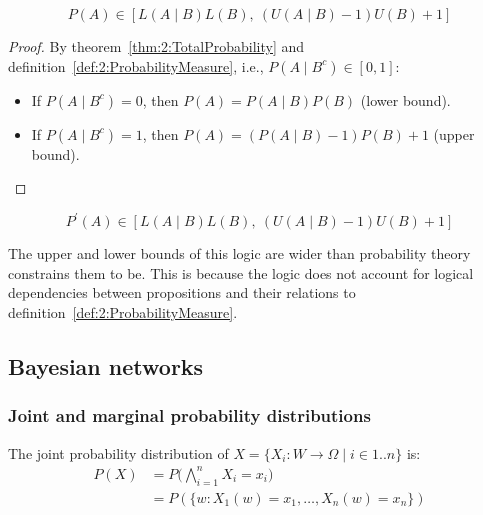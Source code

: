 \begin{thm}
  \begin{equation}
    P(A) \in [L(A \mid B) L(B),\ (U(A \mid B) - 1) U(B) + 1]
  \end{equation}
  \begin{proof}
    By theorem~\ref{thm:2:TotalProbability} and
    definition~\ref{def:2:ProbabilityMeasure}, i.e., $P(A \mid B^c) \in [0, 1]$:
    \begin{itemize}
      \item If $P(A \mid B^c) = 0$, then $P(A) = P(A \mid B) P(B)$ (lower bound).
      \item If $P(A \mid B^c) = 1$, then $P(A) = (P(A \mid B) - 1) P(B) + 1$ (upper bound).
    \end{itemize}
  \end{proof}
\end{thm}

\begin{thm}
  \begin{equation}
    P^\prime(A) \in [L(A \mid B) L(B),\ (U(A \mid B) - 1) U(B) + 1]
  \end{equation}
\end{thm}

The upper and lower bounds of this logic are wider than probability theory
constrains them to be.
This is because the logic does not account for logical dependencies between
propositions and their relations to definition~\ref{def:2:ProbabilityMeasure}.

\subsection{Bayesian networks}

\subsubsection{Joint and marginal probability distributions}

\begin{dfn}
  The joint probability distribution of
  ${X = \{ X_i : W \rightarrow \Omega \mid i \in 1 .. n \}}$ is:
  \begin{align}
    P(X)
     & = P \bigl( \bigwedge_{i = 1}^{n} X_i = x_i \bigr) \nonumber \\
     & = P(\{ w : X_1(w) = x_1, \ldots, X_n(w) = x_n \})
  \end{align}
\end{dfn}

